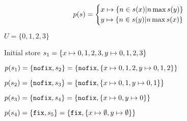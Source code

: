 \documentclass[a4paper, 11pt]{article}
\newcommand\mymapsto{\mathrel{\ooalign{$\rightarrow$\cr%
  \kern-.15ex\raise.275ex\hbox{\scalebox{1}[0.522]{$\mid$}}\cr}}}
\begin{document}
\begin{gather*}
p(s) = 
\begin{cases}
  x \mymapsto \{n \in s(x) | n \max s(y) \}\\
  y \mymapsto \{n \in s(y) | n \max s(x) \}\\
\end{cases}
\end{gather*}

$U = \{0,1,2,3\}$

Initial store $s_1 = \{x \mymapsto {0,1,2,3}, y \mymapsto {0,1,2,3}\}$

$p(s_1) = \{\text{\texttt{nofix}}, s_2\} = \{\text{\texttt{nofix}}, \{x \mymapsto {0,1,2}, y \mymapsto {0,1,2}\}\}$

$p(s_2) = \{\text{\texttt{nofix}}, s_3\} = \{\text{\texttt{nofix}}, \{x \mymapsto {0,1}, y \mymapsto {0,1}\}\}$

$p(s_3) = \{\text{\texttt{nofix}}, s_4\} = \{\text{\texttt{nofix}}, \{x \mymapsto {0}, y \mymapsto {0}\}\}$

$p(s_4) = \{\text{\texttt{fix}}, s_5\} = \{\text{\texttt{fix}}, \{x \mymapsto \emptyset, y \mymapsto \emptyset\}\}$ 


{}

\end{document}
